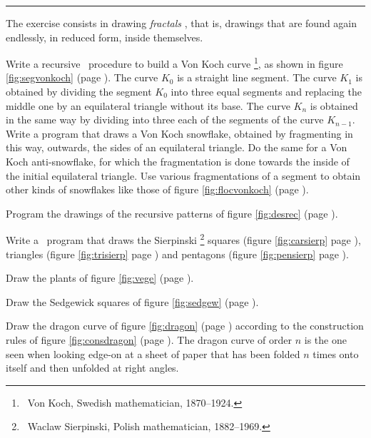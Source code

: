 \noindent \rule{137mm}{0.1mm}\par\nopagebreak %
\begin{exercice}{The exercise consists in drawing {\em fractals} \cite{mandelbrot1}
\cite{mandelbrot2}, that is,
drawings that are found again endlessly, in reduced form, inside themselves.

\tiret  Write a recursive \python\ procedure to build a Von Koch curve\/%
\footnote{\ Von Koch, Swedish mathematician, 1870--1924.}, as
shown in figure \ref{fig:segvonkoch} (page \pageref{fig:segvonkoch}). The curve $K_{0}$
is a straight line segment. The curve $K_{1}$ is obtained by dividing the segment $K_{0}$ into three equal
segments and replacing the middle one by an equilateral triangle without its base.
The curve $K_{n}$ is obtained in the same way by dividing into three each of the segments of the curve
 $K_{n-1}$. Write a program that draws a Von Koch snowflake, obtained by fragmenting in this way, outwards,
 the sides of an equilateral triangle. Do the same for a Von Koch anti-snowflake, for which the
 fragmentation is done towards the inside of the initial equilateral triangle. Use various fragmentations
 of a segment to obtain other kinds of snowflakes like those of figure \ref{fig:flocvonkoch}
 (page \pageref{fig:flocvonkoch}).

\tiret Program the drawings of the recursive patterns of figure \ref{fig:desrec}
(page \pageref{fig:desrec}).

\tiret Write a \python\ program that draws the Sierpinski\/%
\footnote{\ Waclaw Sierpinski, Polish mathematician, 1882--1969.}
squares (figure \ref{fig:carsierp}  page \pageref{fig:carsierp}),
triangles (figure \ref{fig:trisierp}  page \pageref{fig:trisierp}) and
pentagons (figure \ref{fig:pensierp}  page \pageref{fig:pensierp}).

\tiret Draw the plants of figure \ref{fig:vege}  (page \pageref{fig:vege}).

\tiret Draw the Sedgewick squares \cite{sedgewick1} of figure \ref{fig:sedgew}  (page \pageref{fig:sedgew}).

\tiret Draw the dragon curve of figure \ref{fig:dragon}  (page \pageref{fig:dragon})
according to the construction rules of
figure \ref{fig:consdragon}  (page \pageref{fig:consdragon}). The dragon curve of order $n$ is the one
seen when looking edge-on at a sheet of paper that has been folded $n$ times
onto itself and then unfolded at right angles.

}
\end{exercice}
